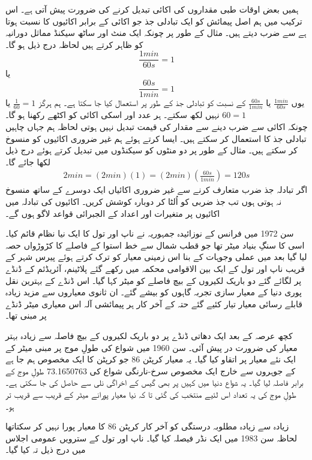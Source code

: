 	ہمیں بعض اوقات طبی مقداروں کی اکائی تبدیل کرنے کی ضرورت پیش آتی ہے۔ اس ترکیب میں ہم اصل پیمائش کو ایک تبادلی جذ جو اکائی کے برابر اکائیوں کا نسبت ہوتا ہے سے ضرب دیتے ہیں۔ مثال کے طور پر چونکہ ایک منٹ اور ساٹھ سیکنڈ مماثل دورانیہ کو ظاہر کرتے ہیں لحاظہ درج ذیل ہو گا۔
	\[\frac{1 min}{60 s} = 1\]
	یا
	\[\frac{60 s}{1 min} = 1\]
	یوں \(\frac{1 min}{60 s}\) یا \(\frac{60 s}{1 min}\) کے نسبت کو تبادلی جذ کے طور پر استعمال کیا جا سکتا ہے۔ ہم ہرگز \(\frac{1}{60}=1\) یا \(60 = 1\) نہیں لکھ سکتے۔ ہر عدد اور اسکی اکائی کو اکٹھے رکھنا ہو گا۔\\چونکہ اکائی سے ضرب دینے سے مقدار کی قیمت تبدیل نہیں ہوتی لحاظہ ہم جہاں چاہیں تبادلی جذ کا استعمال کر سکتے ہیں۔ ایسا کرتے ہوئے ہم غیر ضروری اکائیوں کو منسوخ کر سکتے ہیں۔ مثال کے طور پر دو منٹوں کو سیکنڈوں میں تبدیل کرتے ہوئے درج ذیل لکھا جائے گا۔
	\begin{align}
		2 min = (2 min)(1) = (2 min)(\frac{60 s}{1 min}) = 120 s
	\end{align}
	اگر تبادلہ جذ ضرب متعارف  کرنے سے غیر  ضروری  اکائیاں ایک دوسرے کے ساتھ منسوخ نہ ہوتی ہوں تب جذ ضربی کو اُلٹا کر دوبارہ کوشش کریں۔ اکائیوں کی تبادلہ میں اکائیوں پر متغیرات اور اعداد کے الجبرائی قواعد لاگو ہوں گے۔

	سن 1972 میں فرانس کے نوزائیدہ جمہوریہ نے ناپ اور تول کا ایک نیا نظام قائم کیا۔ اسی کا سنگِ بنیاد میٹر تھا جو قطب شمال سے خط استوا کے فاصلے کا کڑوڑواں حصہ لیا گیا بعد میں عملی وجوہات کے بنا اس زمینی معیار کو ترک کرتے ہوئے پیرس شہر کے قریب ناپ اور تول کے ایک بین الاقوامی محکمہ میں رکھے گئے پلاٹینم، آئریڈئم کے ڈنڈے پر لگائے گئے دو باریک لکیروں کے بیچ فاصلے کو میٹر کہا گیا۔ اس ڈنڈے کے بہترین نقل پوری دنیا کے معیار سازی تجربہ گاہوں کو بیشے گئے۔ ان ثانوی معیاروں سے مزید زیادہ قابلے رسائی معیار تیار کئیے گئے حتہ کے آخر کار ہر پیمائشی آلہ اس معیاری میٹر ڈنڈے پر مبنی تھا۔
	
	کچھ عرصہ کے بعد ایک دھاتی ڈنڈے پر دو باریک لکیروں کے بیچ فاصلہ سے زیادہ بہتر معیار کی ضرورت در پیش آئی۔ سن 1960 میں شواع کی طولِ موج پر مبنی میٹر کے ایک نئے معیار پر اتقاو کیا گیا۔ یہ معیار کرپٹن 86 جو کرپٹن کا ایک مخصوص ہم جا ہے کے جوہروں سے خارج ایک مخصوص سرخ-نارنگی شواع کی 73.1650763 طولِ موج کے برابر فاصلہ لیا گیا۔ یہ شواع دنیا میں کہیں پر بھی گیس کے اخراگی نلی سے حاصل کی جا سکتی ہے۔ طولِ موج کی یہ تعداد اس لئیے منتخب کی گئی تا کہ نیا معیار پورانے میٹر کے قریب سے قریب تر ہو۔
	
	زیادہ سے زیادہ مطلوبہ درستگی کو آخر کار کرپٹن 86 کا معیار پورا نہیں کر سکتاتھا لحاظہ سن 1983 میں ایک نڈر فیصلہ کیا گیا۔ ناپ اور تول کے سترویں عمومی اجلاس میں درج ذیل تہ کیا گیا۔
	
